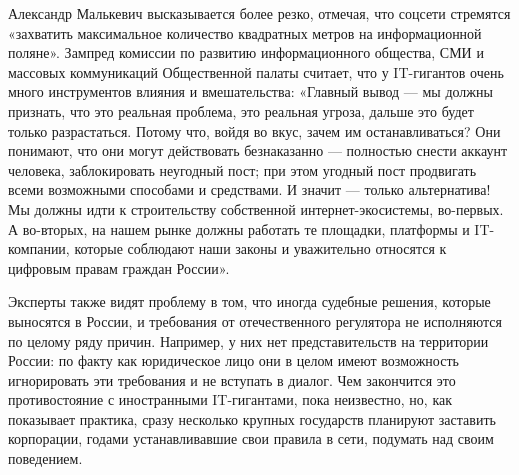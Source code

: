 Александр Малькевич высказывается более резко, отмечая, что соцсети стремятся
«захватить максимальное количество квадратных метров на информационной поляне».
Зампред комиссии по развитию информационного общества, СМИ и массовых
коммуникаций Общественной палаты считает, что у IT-гигантов очень много
инструментов влияния и вмешательства: «Главный вывод — мы должны признать, что
это реальная проблема, это реальная угроза, дальше это будет только
разрастаться. Потому что, войдя во вкус, зачем им останавливаться? Они
понимают, что они могут действовать безнаказанно — полностью снести аккаунт
человека, заблокировать неугодный пост; при этом угодный пост продвигать всеми
возможными способами и средствами. И значит — только альтернатива! Мы должны
идти к строительству собственной интернет-экосистемы, во-первых. А во-вторых,
на нашем рынке должны работать те площадки, платформы и IT- компании, которые
соблюдают наши законы и уважительно относятся к цифровым правам граждан
России».

Эксперты также видят проблему в том, что иногда судебные решения, которые
выносятся в России, и требования от отечественного регулятора не исполняются по
целому ряду причин. Например, у них нет представительств на территории России:
по факту как юридическое лицо они в целом имеют возможность игнорировать эти
требования и не вступать в диалог. Чем закончится это противостояние с
иностранными IT-гигантами, пока неизвестно, но, как показывает практика, сразу
несколько крупных государств планируют заставить корпорации, годами
устанавливавшие свои правила в сети, подумать над своим поведением.
